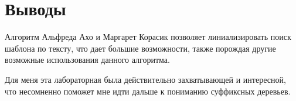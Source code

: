 \section{Выводы}

Алгоритм Альфреда Ахо и Маргарет Корасик позволяет линиализировать поиск шаблона по тексту, что дает большие возможности, также порождая другие возможные использования данного алгоритма. 

Для меня эта лабораторная была действительно захватывающей и интересной, что несомненно поможет мне идти дальше к пониманию суффиксных деревьев.

\pagebreak